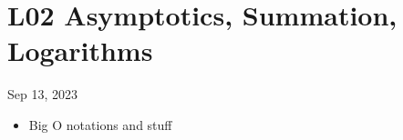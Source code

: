 \section{L02 Asymptotics, Summation, Logarithms}
Sep 13, 2023
\begin{itemize}
	\item Big O notations and stuff
\end{itemize}
